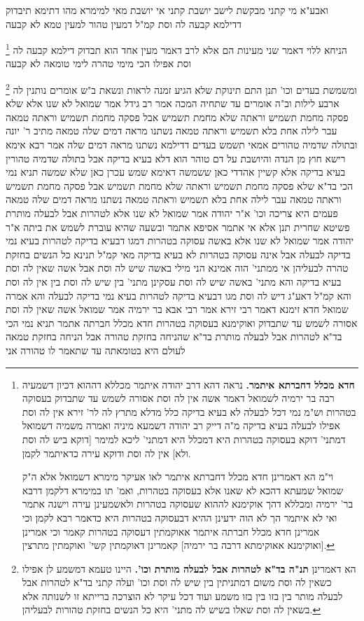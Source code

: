 \documentclass[12pt, openany]{book}
\newcommand{\footnotecomment}[1]{
	\renewcommand\thefootnote{}
	\footnote{#1}}
\newcommand{\commenta}[1]{\footnotecomment{#1}}
\begin{document}
{ואבע"א מי קתני מבקשת לישב יושבת קתני אי יושבת מאי למימרא מהו דתימא תיבדוק דדילמא קבעה לה וסת קמ"ל דמעין טהור למעין טמא לא קבעה 
\commenta{\textbf{חדא מכלל דחברתא איתמר.} נראה דהא דרב יהודה איתמר מכללא דההוא דכיון דשמעיה רבה בר ירמיה לשמואל דאמר אשה אין לה וסת אסורה לשמש עד שתבדוק בעסוקה בטהרות וש"מ נמי דכל לבעלה לא בעיא בדיקה כלל מדלא מתרץ לה לר' זירא אין לה וסת אפילו לבעלה בעיא בדיקה מ"ה דייק רב יהודה דשמעא מיניה ואמרה משמיה דשמואל דמתני' דוקא בעסוקה בטהרות היא דמכלל היא דמתני' ליכא למימר [דוקא ביש לה וסת ולא] אין לה וסת ודוקא עירה כדאיתמר לקמן.\par וי"מ הא דאמרינן חדא מכלל דחברתא איתמר לאו אעיקר מימרא דשמואל אלא ה"ק שמואל שמעתא דהכא לא שאנו אלא בעסוקה בטהרות, ואמ' תו במימרא דלקמן דרבא בר' ירמיה ומכללא דהך אוקימנא לההוא שעסוקה בטהרות ולאשמעינן עירה וישנה אתמר ואי לא איתמר הך לא הוה ידעינן ההיא דבעסוקה בטהרות היא כדאמר רבא לקמן וכי אמרינן חדא מכלל חברתה איתמר אאוקמתין דעסוקה בטהרות קאמר וכי אמרינן [ואוקימנא אאוקימתא דרבה בר ירמיה] קאמרינן דאוקמתין קשי' ואוקמתין מתרצין. }
הניחא ללוי דאמר שני מעינות הם אלא לרב דאמר מעין אחד הוא תבדוק דילמא קבעה לה וסת אפילו הכי מימי טהרה לימי טומאה לא קבעה
\commenta{הא דאמרינן \textbf{תנ"ה בד"א לטהרות אבל לבעלה מותרת וכו'.} היינו טעמא דמשמע לן אפילו כשאין לה וסת משום דמתניתין בין שיש לה וסת וכו' ועלה קתני בד"א לטהרות אבל לבעלה מותר בין בזו בין בזו משמע ועוד דכל עיקר לא הוצרכה ברייתא זו לשנותה אלא בשאין לה וסת שאלו בשיש לה מתני' היא כל הנשים בחזקת טהורות לבעליהן. }
ומשמשת בעדים וכו' תנן התם תינוקת שלא הגיע זמנה לראות ונשאת ב"ש אומרים נותנין לה ארבע לילות וב"ה אומרים עד שתחיה המכה 
אמר רב גידל אמר שמואל לא שנו אלא שלא פסקה מחמת תשמיש וראתה שלא מחמת תשמיש אבל פסקה מחמת תשמיש וראתה טמאה 
עבר לילה אחת בלא תשמיש וראתה טמאה נשתנו מראה דמים שלה טמאה מתיב ר' יונה ובתולה שדמיה טהורים אמאי תשמש בעדים דדילמא נשתנו מראה דמים שלה 
אמר רבא אימא רישא חוץ מן הנדה והיושבת על דם טוהר הוא דלא בעיא בדיקה אבל בתולה שדמיה טהורין בעיא בדיקה אלא קשיין אהדדי 
כאן ששמשה דאימא שמש עכרן כאן שלא שמשה 
תניא נמי הכי בד"א שלא פסקה מחמת תשמיש וראתה שלא מחמת תשמיש
אבל פסקה מחמת תשמיש וראתה טמאה עבר לילה אחת בלא תשמיש וראתה טמאה נשתנו מראה דמים שלה טמאה 
פעמים היא צריכה וכו' א"ר יהודה אמר שמואל לא שנו אלא לטהרות אבל לבעלה מותרת פשיטא שחרית תנן 
אלא אי אתמר אסיפא אתמר ובשעה שהיא עוברת לשמש את ביתה א"ר יהודה אמר שמואל לא שנו אלא באשה עסוקה בטהרות דמגו דבעיא בדיקה לטהרות בעיא נמי בדיקה לבעלה אבל אינה עסוקה בטהרות לא בעיא בדיקה 
מאי קמ"ל תנינא כל הנשים בחזקת טהרה לבעליהן אי ממתני' הוה אמינא הני מילי באשה שיש לה וסת אבל אשה שאין לה וסת בעיא בדיקה 
והא מתני' באשה שיש לה וסת עסקינן מתני' בין שיש לה וסת בין אין לה וסת והא קמ"ל דאע"ג דיש לה וסת מגו דבעיא בדיקה לטהרות בעיא נמי בדיקה לבעלה 
והא אמרה שמואל חדא זימנא דאמר רבי זירא אמר רבי אבא בר ירמיה אמר שמואל אשה שאין לה וסת אסורה לשמש עד שתבדוק ואוקימנא בעסוקה בטהרות חדא מכלל חברתה אתמר 
תניא נמי הכי בד"א לטהרות אבל לבעלה מותרת בד"א שהניחה בחזקת טהורה אבל הניחה בחזקת טמאה לעולם היא בטומאתה עד שתאמר לו טהורה אני}
\end{document}
